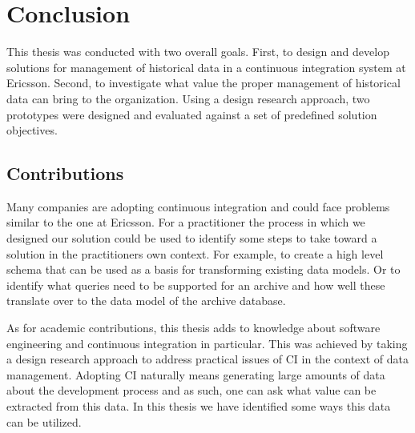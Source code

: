 \chapter{Conclusion}
\label{chap:conclusion}
This thesis was conducted with two overall goals. First, to design and develop solutions for management of historical data in a continuous integration system at Ericsson. Second, to investigate what value the proper management of historical data can bring to the organization. Using a design research approach, two prototypes were designed and evaluated against a set of predefined solution objectives. 



%
%


\section{Contributions}


Many companies are adopting continuous integration and could face problems similar to the one at Ericsson. For a practitioner the process in which we designed our solution could be used to identify some steps to take toward a solution in the practitioners own context. For example, to create a high level schema that can be used as a basis for transforming existing data models. Or to identify what queries need to be supported for an archive and how well these translate over to the data model of the archive database.

As for academic contributions, this thesis adds to knowledge about software engineering and continuous integration in particular. This was achieved by taking a design research approach to address practical issues of CI in the context of data management. Adopting CI naturally means generating large amounts of data about the development process and as such, one can ask what value can be extracted from this data. In this thesis we have identified some ways this data can be utilized. 


